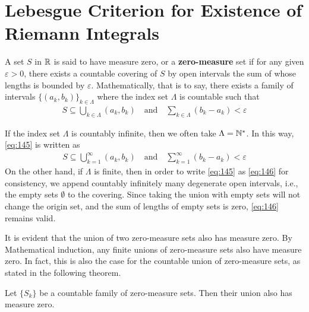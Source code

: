 \documentclass[thmcnt=section, 12pt]{my-elegantbook}
\begin{document}

\section{Lebesgue Criterion for Existence of Riemann Integrals}


\begin{definition} \label{def:6}
	A set $S$ in $\mathbb{R}$ is said to have measure zero,
	or a \textbf{zero-measure} set 
	if for any given $\varepsilon > 0$,
	there exists a countable covering of $S$
	by open intervals the sum of whose lengths 
	is bounded by $\varepsilon$.
	Mathematically, that is to say, there exists 
	a family of intervals $\{(a_k, b_k)\}_{k \in \Lambda}$
	where the index set $\Lambda$ is countable such that
	\begin{align}
		S \subseteq \bigcup_{k \in \Lambda} (a_k, b_k)
		\quad \text{and} \quad 
		\sum_{k \in \Lambda} (b_k - a_k) < \varepsilon
		\label{eq:145}
	\end{align}
\end{definition}

If the index set $\Lambda$ is countably infinite,
then we often take $\Lambda = \mathbb{N}^\ast$.
In this way, \eqref{eq:145} is written as 
\begin{align}
	S \subseteq \bigcup_{k=1}^\infty (a_k, b_k)
	\quad \text{and} \quad 
	\sum_{k=1}^\infty (b_k - a_k) < \varepsilon
	\label{eq:146}
\end{align}
On the other hand, 
if $\Lambda$ is finite,
then in order to write \eqref{eq:145}
as \eqref{eq:146} for consistency, 
we append countably infinitely many degenerate open intervals,
i.e., the empty sets $\emptyset$ to the covering.
Since taking the union with empty sets will not change the origin set,
and the sum of lengths of empty sets is zero,
\eqref{eq:146} remains valid.


It is evident that the union of two zero-measure sets also has measure zero.
By Mathematical induction, 
any finite unions of zero-measure sets also have measure zero.
In fact, this is also the case for the countable union of zero-measure sets,
as stated in the following theorem.

\begin{theorem} \label{thm:86}
	Let $\{S_k\}$ be a countable family of zero-measure sets.
	Then their union also has measure zero.
\end{theorem}
\end{document}
